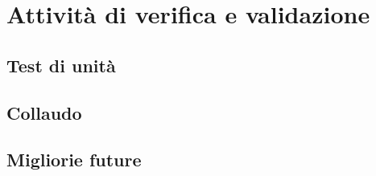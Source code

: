 \chapter{Attività di verifica e validazione}
\label{cap:verifica-validazione}

\section{Test di unità}

\section{Collaudo}

\section{Migliorie future}

